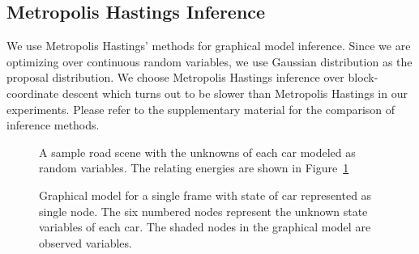 \subsection{Metropolis Hastings Inference}
We use Metropolis Hastings' methods \cite{mackay1998introduction} for graphical model inference. Since we are
optimizing over continuous random variables, we use Gaussian distribution as
the proposal distribution. We choose Metropolis Hastings inference over
block-coordinate descent which turns out to be slower than Metropolis Hastings
in our experiments. Please refer to the supplementary material for the
comparison of inference methods.

\begin{figure}
  \centering
  \newcommand{\imagewidth}{\columnwidth}
  
  \caption{A sample road scene with the unknowns of each car modeled as random variables. 
  The relating energies are shown in Figure~\ref{fig:graphmodel}}
\end{figure}
\begin{figure}
    
    \caption{Graphical model for a single frame with state of car represented
    as single node.  The six numbered nodes represent the unknown state variables of each car. The shaded nodes in the graphical model are observed variables. }
  \label{fig:graphmodel}
\end{figure}
